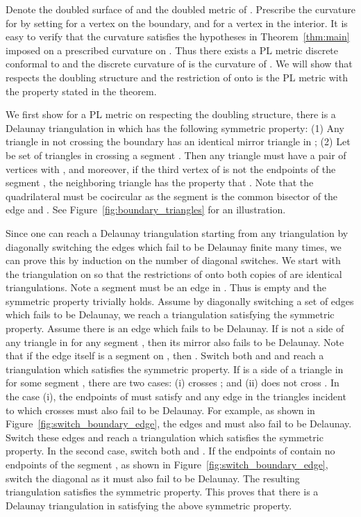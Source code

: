 \documentclass[11pt]{article}
\newenvironment{proof}[1][Proof]{\begin{trivlist}
\item[\hskip \labelsep {\bfseries #1}]}{\end{trivlist}}
\begin{document}
\begin{proof}
Denote  the doubled surface of  and  the doubled metric
of . Prescribe the curvature  for  by setting 
 for a vertex  on the boundary, and  for a vertex  in the interior.  
It is easy to verify that the curvature  satisfies the hypotheses in Theorem~\ref{thm:main} imposed 
on a prescribed curvature on . Thus there exists a PL metric  discrete
conformal to  and the discrete curvature of  is the curvature of .
We will show that  respects the doubling structure and the restriction of  onto
 is the PL metric  with the property stated in the theorem. 

We first show for a PL metric  on  respecting the doubling structure, 
there is a Delaunay triangulation  in  which has the following symmetric property: 
(1) Any triangle  in  not crossing the boundary has an identical mirror triangle  in ; 
(2) Let  be set of triangles in  crossing a segment . Then any triangle  
must have a pair of vertices  with , and moreover, if the third vertex  of  is not
the endpoints of the segment , the neighboring triangle  has the property that . 
Note that the quadrilateral  must be cocircular as the segment  is the common bisector 
of the edge  and . See Figure~\ref{fig:boundary_triangles} for an illustration. 

Since one can reach a Delaunay triangulation starting from any triangulation by diagonally
switching the edges which fail to be Delaunay finite many times, we can prove this by induction
on the number of diagonal switches. We start with the triangulation  on  
so that the restrictions of  onto both copies of  are identical triangulations. Note a segment 
 must be an edge in . Thus  is empty and the symmetric property trivially holds.
Assume by diagonally switching a set of edges which fails to be Delaunay, we reach a triangulation  
satisfying the symmetric property. Assume there is an edge  which fails to be Delaunay. If  
is not a side of any triangle in  for any segment , then its mirror  also fails 
to be Delaunay. Note that if the edge  itself is a segment on , then . Switch both  
and  and reach a triangulation  which satisfies the symmetric property. If  is a side of a 
triangle in  for some segment , there are two cases: (i)  crosses ; 
and (ii)  does not cross . In the case (i), the endpoints  of  must satisfy
 and any edge in the triangles incident to  which crosses  must also fail to be Delaunay.  
For example, as shown in Figure~\ref{fig:switch_boundary_edge}, the edges  and  must also fail 
to be Delaunay. Switch these edges and reach a triangulation  which satisfies the symmetric property. 
In the second case, switch both  and . If the endpoints of  contain no endpoints of the segment 
, as shown in Figure~\ref{fig:switch_boundary_edge}, switch the diagonal  as it must also fail to be Delaunay. 
The resulting triangulation  satisfies the symmetric property. This proves that there is a 
Delaunay triangulation  in  satisfying the above symmetric property. 


\end{proof}
\end{document}
